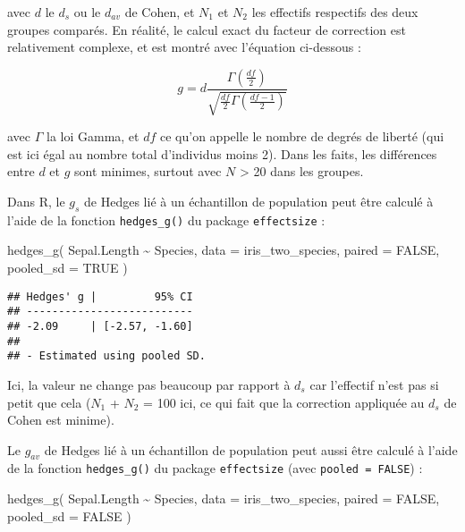 \documentclass[
]{book}
\newenvironment{Shaded}{\begin{snugshade}}{\end{snugshade}}
\newcommand{\AttributeTok}[1]{\textcolor[rgb]{0.77,0.63,0.00}{#1}}
\newcommand{\ConstantTok}[1]{\textcolor[rgb]{0.00,0.00,0.00}{#1}}
\newcommand{\FunctionTok}[1]{\textcolor[rgb]{0.00,0.00,0.00}{#1}}
\newcommand{\NormalTok}[1]{#1}
\newcommand{\SpecialCharTok}[1]{\textcolor[rgb]{0.00,0.00,0.00}{#1}}
\begin{document}
avec \(d\) le \(d_s\) ou le \(d_{av}\) de Cohen, et \(N_{1}\) et \(N_{2}\) les effectifs respectifs des deux groupes comparés. En réalité, le calcul exact du facteur de correction est relativement complexe, et est montré avec l'équation ci-dessous \autocite{kelleyEffectsNonnormalDistributions2005} :

\[g =  d \frac{\Gamma(\frac{df}{2})}{\sqrt{\frac{df}{2}\Gamma(\frac{df-1}{2})}} \]

avec \(\Gamma\) la loi Gamma, et \(df\) ce qu'on appelle le nombre de degrés de liberté (qui est ici égal au nombre total d'individus moins 2). Dans les faits, les différences entre \(d\) et \(g\) sont minimes, surtout avec \(N\) \textgreater{} 20 dans les groupes.

Dans R, le \(g_{s}\) de Hedges lié à un échantillon de population peut être calculé à l'aide de la fonction \texttt{hedges\_g()} du package \texttt{effectsize} :

\begin{Shaded}
\begin{Highlighting}[]
\FunctionTok{hedges\_g}\NormalTok{(}
\NormalTok{  Sepal.Length }\SpecialCharTok{\textasciitilde{}}\NormalTok{ Species,}
  \AttributeTok{data =}\NormalTok{ iris\_two\_species, }
  \AttributeTok{paired =} \ConstantTok{FALSE}\NormalTok{, }
  \AttributeTok{pooled\_sd =} \ConstantTok{TRUE}
\NormalTok{  )}
\end{Highlighting}
\end{Shaded}

\begin{verbatim}
## Hedges' g |         95% CI
## --------------------------
## -2.09     | [-2.57, -1.60]
## 
## - Estimated using pooled SD.
\end{verbatim}

Ici, la valeur ne change pas beaucoup par rapport à \(d_s\) car l'effectif n'est pas si petit que cela (\(N_{1}\) + \(N_{2}\) = 100 ici, ce qui fait que la correction appliquée au \(d_{s}\) de Cohen est minime).

Le \(g_{av}\) de Hedges lié à un échantillon de population peut aussi être calculé à l'aide de la fonction \texttt{hedges\_g()} du package \texttt{effectsize} (avec \texttt{pooled\ =\ FALSE}) :

\begin{Shaded}
\begin{Highlighting}[]
\FunctionTok{hedges\_g}\NormalTok{(}
\NormalTok{  Sepal.Length }\SpecialCharTok{\textasciitilde{}}\NormalTok{ Species,}
  \AttributeTok{data =}\NormalTok{ iris\_two\_species, }
  \AttributeTok{paired =} \ConstantTok{FALSE}\NormalTok{, }
  \AttributeTok{pooled\_sd =} \ConstantTok{FALSE}
\NormalTok{  )}
\end{Highlighting}
\end{Shaded}
\end{document}

